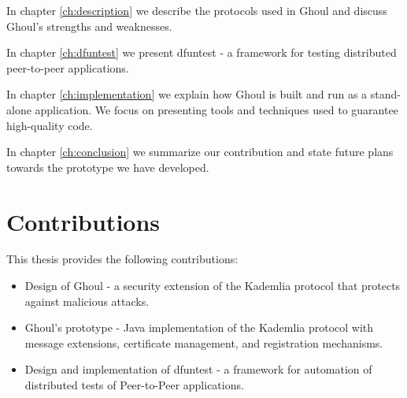 In chapter \ref{ch:description} we describe the protocols used in Ghoul and
discuss Ghoul's strengths and weaknesses.

In chapter \ref{ch:dfuntest} we present dfuntest - a framework for testing
distributed peer-to-peer applications.

In chapter \ref{ch:implementation} we explain how Ghoul is built and run as a
stand-alone application.
We focus on presenting tools and techniques used to guarantee high-quality code.

In chapter \ref{ch:conclusion} we summarize our contribution and state future
plans towards the prototype we have developed.

\section{Contributions}
This thesis provides the following contributions:
\begin{itemize}
  \item Design of Ghoul - a security extension of the Kademlia protocol that
    protects against malicious attacks.
  \item Ghoul's prototype - Java implementation of the Kademlia protocol with
    message extensions, certificate management, and registration mechanisms.
  \item Design and implementation of dfuntest - a framework for automation of
    distributed tests of Peer-to-Peer applications.
\end{itemize}
